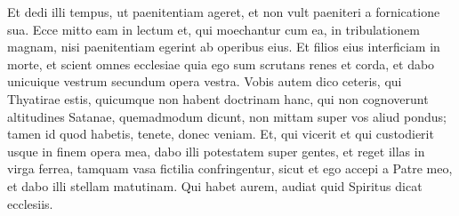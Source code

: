 \begin{biblechapter}
\verse Et dedi illi tempus, ut paenitentiam ageret, et non vult paeniteri a fornicatione sua. 
\verse Ecce mitto eam in lectum et, qui moechantur cum ea, in tribulationem magnam, nisi paenitentiam egerint ab operibus eius. 
\verse Et filios eius interficiam in morte, et scient omnes ecclesiae quia ego sum scrutans renes et corda, et dabo unicuique vestrum secundum opera vestra. 
\verse Vobis autem dico ceteris, qui Thyatirae estis, quicumque non habent doctrinam hanc, qui non cognoverunt altitudines Satanae, quemadmodum dicunt, non mittam super vos aliud pondus; 
\verse tamen id quod habetis, tenete, donec veniam. 
\verse Et, qui vicerit et qui custodierit usque in finem opera mea, dabo illi potestatem super gentes, 
\verse et reget illas in virga ferrea, tamquam vasa fictilia confringentur, 
\verse sicut et ego accepi a Patre meo, et dabo illi stellam matutinam. 
\verse Qui habet aurem, audiat quid Spiritus dicat ecclesiis. 
\end{biblechapter}

